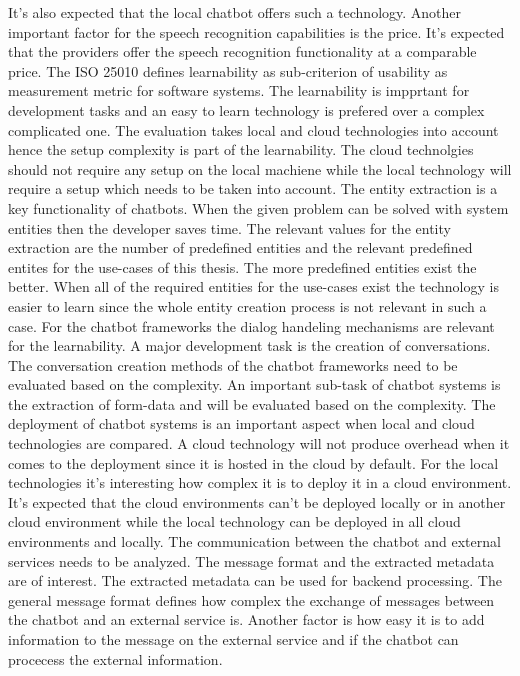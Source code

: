 It's also expected that the local chatbot offers such a technology.
Another important factor for the speech recognition capabilities is the 
price.
It's expected that the providers offer the speech recognition functionality 
at a comparable price.
The ISO 25010\cite{iso25010} defines learnability as sub-criterion of usability as measurement
metric for software systems.
The learnability is impprtant for development tasks and an easy to learn 
technology is prefered over a complex complicated one.
The evaluation takes local and cloud technologies into account hence the 
setup complexity is part of the learnability.
The cloud technolgies should not require any setup on the local machiene while 
the local technology will require a setup which needs to be taken into account.
The entity extraction is a key functionality of chatbots.
When the given problem can be solved with system entities then the developer
saves time.
The relevant values for the entity extraction are the number of predefined entities and 
the relevant predefined entites for the use-cases of this thesis.
The more predefined entities exist the better.
When all of the required entities for the use-cases exist the 
technology is easier to learn since the whole entity creation process is not 
relevant in such a case.
For the chatbot frameworks the dialog handeling mechanisms are relevant for the learnability.
A major development task is the creation of conversations.
The conversation creation methods of the chatbot frameworks need to be evaluated based on the 
complexity.
An important sub-task of chatbot systems is the extraction of form-data and will be evaluated based 
on the complexity.
The deployment of chatbot systems is an important aspect when local and cloud technologies are 
compared.
A cloud technology will not produce overhead when it comes to the deployment since it is 
hosted in the cloud by default.
For the local technologies it's interesting how complex it is to deploy it in a cloud 
environment.
It's expected that the cloud environments can't be deployed locally or in another cloud 
environment while the local technology can be deployed in all cloud environments and locally.
The communication between the chatbot and external services needs to be analyzed.
The message format and the extracted metadata are of interest.
The extracted metadata can be used for backend processing.
The general message format defines how complex the exchange of messages between the 
chatbot and an external service is.
Another factor is how easy it is to add information to the message on the 
external service and if the chatbot can procecess the external information.


